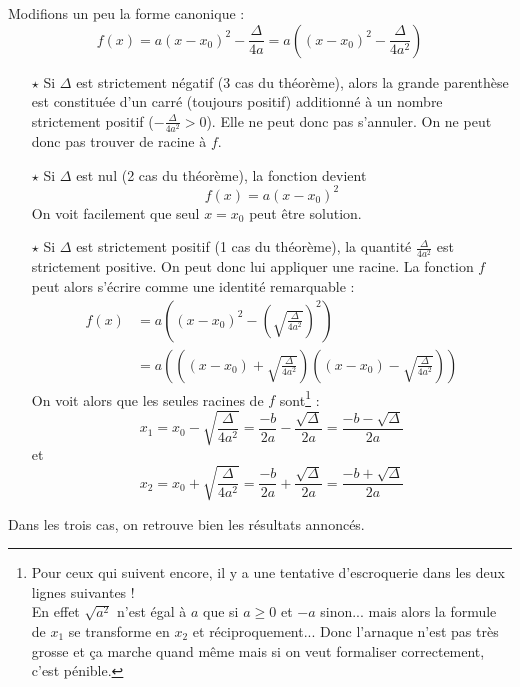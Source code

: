 \documentclass[cours]{lycee-deveaux}
\begin{document}
\begin{preuve}
  Modifions un peu la forme canonique :
  \[
  f(x) = a(x-x_0)^2-\frac{\Delta}{4a} = a\left((x-x_0)^2-\frac{\Delta}{4a^2}\right)
  \]
  \begin{itemize}
    \item[$\star$]
      Si $\Delta$ est strictement négatif (3 cas du théorème), alors la grande parenthèse est constituée
      d'un carré (toujours positif) additionné à un nombre strictement positif ($-\frac{\Delta}{4a^2}>0$).
      Elle ne peut donc pas s'annuler. On ne peut donc pas trouver de racine à $f$.

    \item[$\star$]
      Si $\Delta$ est nul (2 cas du théorème), la fonction devient
      \[
      f(x) = a(x-x_0)^2
      \]
      On voit facilement que seul $x=x_0$ peut être solution.

    \item[$\star$]
      Si $\Delta$ est strictement positif (1 cas du théorème), la quantité $\frac{\Delta}{4a^2}$ est strictement positive.
      On peut donc lui appliquer une racine. La fonction $f$ peut alors s'écrire comme une identité remarquable :
      \[\begin{split}
      f(x)
      & = a\left( \left(x-x_0\right)^2 - \left(\sqrt{\frac{\Delta}{4a^2}}\right)^2 \right) \\
      & = a\left( \left((x-x_0)+\sqrt{\frac{\Delta}{4a^2}}\right) \left((x-x_0)-\sqrt{\frac{\Delta}{4a^2}}\right) \right)
      \end{split}\]
      On voit alors que les seules racines de $f$ sont\footnote{Pour ceux qui suivent encore, il y a une tentative d'escroquerie dans les deux lignes suivantes !\\
        En effet $\sqrt{a^2}$ n'est égal à $a$ que si $a\geq 0$ et $-a$ sinon...
        mais alors la formule de $x_1$ se transforme en $x_2$ et réciproquement...
        Donc l'arnaque n'est pas très grosse et ça marche quand même mais si on veut formaliser correctement, c'est pénible.} :
      \[
      x_1 = x_0-\sqrt{\frac{\Delta}{4a^2}} = \frac{-b}{2a}-\frac{\sqrt{\Delta}}{2a} = \frac{-b-\sqrt{\Delta}}{2a}
      \]
      et
      \[
      x_2 = x_0+\sqrt{\frac{\Delta}{4a^2}} = \frac{-b}{2a}+\frac{\sqrt{\Delta}}{2a} = \frac{-b+\sqrt{\Delta}}{2a}
      \]
  \end{itemize}

  Dans les trois cas, on retrouve bien les résultats annoncés.
\end{preuve}
\end{document}
